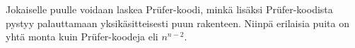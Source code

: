 Jokaiselle puulle voidaan laskea
Prüfer-koodi, minkä lisäksi
Prüfer-koodista pystyy palauttamaan
yksikäsitteisesti puun rakenteen.
Niinpä erilaisia puita on yhtä monta
kuin Prüfer-koodeja eli $n^{n-2}$.


% 
% 
% 
% 
% 
% 
% 
% 
% 
